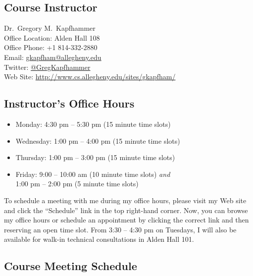 

\usepackage[compact]{titlesec}



\subsection*{Course Instructor}
Dr.\ Gregory M.\ Kapfhammer\\
\noindent Office Location: Alden Hall 108 \\
\noindent Office Phone: +1 814-332-2880 \\
\noindent Email: \url{gkapfham@allegheny.edu} \\
\noindent Twitter: \url{@GregKapfhammer} \\
\noindent Web Site: \url{http://www.cs.allegheny.edu/sites/gkapfham/} 

\subsection*{Instructor's Office Hours}

\begin{itemize}
	\itemsep 0em
	\item Monday: 4:30 pm -- 5:30 pm (15 minute time slots)
	\item Wednesday: 1:00 pm -- 4:00 pm (15 minute time slots)
	\item Thursday: 1:00 pm -- 3:00 pm (15 minute time slots)
	\item Friday: 9:00 -- 10:00 am (10 minute time slots) {\em and} \\ \hspace*{.49in} 1:00 pm -- 2:00 pm (5 minute time slots)
\end{itemize}

\noindent 
To schedule a meeting with me during my office hours, please visit my Web site and click the ``Schedule'' link
in the top right-hand corner. Now, you can browse my office hours or schedule an appointment by clicking the correct
link and then reserving an open time slot. From 3:30 -- 4:30 pm on Tuesdays, I will also be available for walk-in
technical consultations in Alden Hall 101.  

\subsection*{Course Meeting Schedule}

